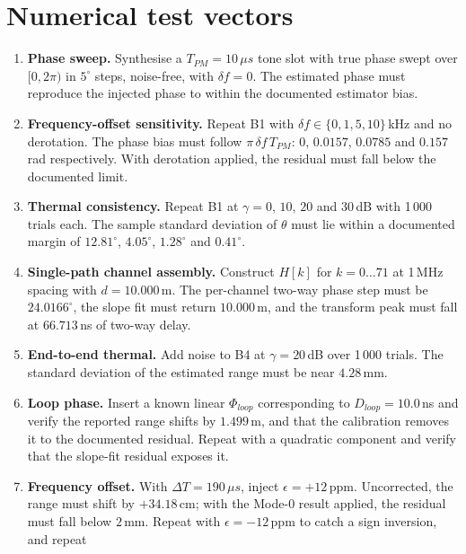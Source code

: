 \documentclass[11pt,a4paper]{article}
\newcommand{\us}{\,\ensuremath{\upmu}s}
\newcommand{\Tpm}{T_{PM}}
\providecommand{\upmu}{\mu}
\begin{document}
\section{Numerical test vectors}

\begin{enumerate}[label=\textbf{B\arabic*.},leftmargin=2.6em,itemsep=2pt]
  \item \textbf{Phase sweep.} Synthesise a $\Tpm = 10\us$ tone slot with true phase swept over
    $[0,2\pi)$ in $5^{\circ}$ steps, noise-free, with $\delta f = 0$. The estimated phase must
    reproduce the injected phase to within the documented estimator bias.
  \item \textbf{Frequency-offset sensitivity.} Repeat B1 with $\delta f \in \{0, 1, 5, 10\}$\,kHz and
    no derotation. The phase bias must follow $\pi\,\delta f\,\Tpm$: $0$, $0.0157$, $0.0785$ and
    $0.157$\,rad respectively. With derotation applied, the residual must fall below the documented
    limit.
  \item \textbf{Thermal consistency.} Repeat B1 at $\gamma = 0$, $10$, $20$ and $30$\,dB with 1\,000
    trials each. The sample standard deviation of $\theta$ must lie within a documented margin of
    $12.81^{\circ}$, $4.05^{\circ}$, $1.28^{\circ}$ and $0.41^{\circ}$.
  \item \textbf{Single-path channel assembly.} Construct $H[k]$ for $k = 0\ldots71$ at 1\,MHz spacing
    with $d = 10.000$\,m. The per-channel two-way phase step must be $24.0166^{\circ}$, the slope fit
    must return $10.000$\,m, and the transform peak must fall at $66.713$\,ns of two-way delay.
  \item \textbf{End-to-end thermal.} Add noise to B4 at $\gamma = 20$\,dB over 1\,000 trials. The
    standard deviation of the estimated range must be near $4.28$\,mm.
  \item \textbf{Loop phase.} Insert a known linear $\Phi_{loop}$ corresponding to $D_{loop} = 10.0$\,ns
    and verify the reported range shifts by $1.499$\,m, and that the calibration removes it to the
    documented residual. Repeat with a quadratic component and verify that the slope-fit residual
    exposes it.
  \item \textbf{Frequency offset.} With $\Delta T = 190\us$, inject $\epsilon = +12$\,ppm.
    Uncorrected, the range must shift by $+34.18$\,cm; with the Mode-0 result applied, the residual
    must fall below $2$\,mm. Repeat with $\epsilon = -12$\,ppm to catch a sign inversion, and repeat

\end{enumerate}
\end{document}
